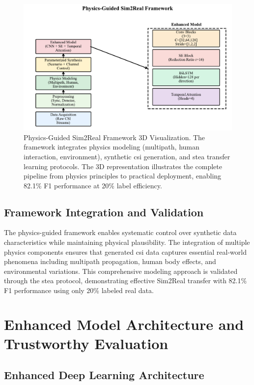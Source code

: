 \documentclass[journal]{IEEEtran}
\begin{document}
\begin{figure}[ht]
\centering
\includegraphics[width=\columnwidth]{figures/fig2_physics_guided_framework.pdf}%
\caption{Physics-Guided Sim2Real Framework 3D Visualization. The framework integrates physics modeling (multipath, human interaction, environment), synthetic \gls{csi} generation, and \gls{stea} transfer learning protocols. The 3D representation illustrates the complete pipeline from physics principles to practical deployment, enabling 82.1\% F1 performance at 20\% label efficiency.}
\label{fig:physics_3d_framework}
\end{figure}

\subsection{Framework Integration and Validation}

The physics-guided framework enables systematic control over synthetic data characteristics while maintaining physical plausibility. The integration of multiple physics components ensures that generated \gls{csi} data captures essential real-world phenomena including multipath propagation, human body effects, and environmental variations. This comprehensive modeling approach is validated through the \gls{stea} protocol, demonstrating effective Sim2Real transfer with 82.1\% F1 performance using only 20\% labeled real data.

\section{Enhanced Model Architecture and Trustworthy Evaluation}

\subsection{Enhanced Deep Learning Architecture}
\end{document}
